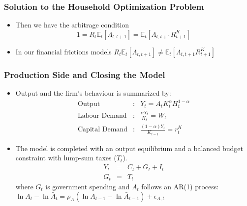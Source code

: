 \documentclass[xcolor=dvipsnames,handout,aspectratio=169]{beamer}
\begin{document}
 \begin{frame}
 \frametitle{\textbf{Solution to the Household Optimization Problem}}
 \begin{itemize}
\item Then we have the arbitrage condition
 \begin{equation}\label{RBCArbitrage} \nonumber
 1= R_t \mathbb{E}_t\left[ \Lambda_{t,t+1} \right]=\mathbb{E}_t\left[ \Lambda_{t,t+1} R_{t+1}^K\right]
 \end{equation}
 \item In our financial frictions models $R_t \mathbb{E}_t\left[ \Lambda_{t,t+1} \right]\neq \mathbb{E}_t\left[ \Lambda_{t,t+1} R_{t+1}^K\right]$
 \end{itemize}
 \end{frame}

  \begin{frame}
 \frametitle{\textbf{Production Side and Closing the Model}}
 \begin{itemize}
 \item  Output and the firm's behaviour is summarized by:
  \begin{eqnarray}
 \mbox{Output}&:& Y_{t}=A_tK_t^{\alpha}H_t^{1-\alpha}\label{RBCPFWhole} \nonumber\\
 \mbox{Labour Demand}&:&  \frac{\alpha Y_{t}}{H_t} = W_t\label{RBCFOCW1} \nonumber\\
 \mbox{Capital Demand}&:& \frac{(1-\alpha) Y_{t}}{K_{t-1}} = r_t^K\label{RBCFOK1} \nonumber
   \end{eqnarray}
\item The model is completed with an output equilibrium and a balanced budget constraint with lump-sum taxes ($T_t$).
 \begin{eqnarray*}
  Y_{t} &=&C_{t}+G_t+I_t\\
 \label{GBC1}G_t&=&T_t
 \end{eqnarray*}
where $G_t$ is government spending and $A_t$ follows an AR(1) process: $\ln A_{t}-\ln \bar{A}_{t}=\rho_{A} (\ln A_{t-1}-\ln \bar{A}_{t-1})+\epsilon_{A,t}$
 \end{itemize}
 \end{frame}
\end{document}
